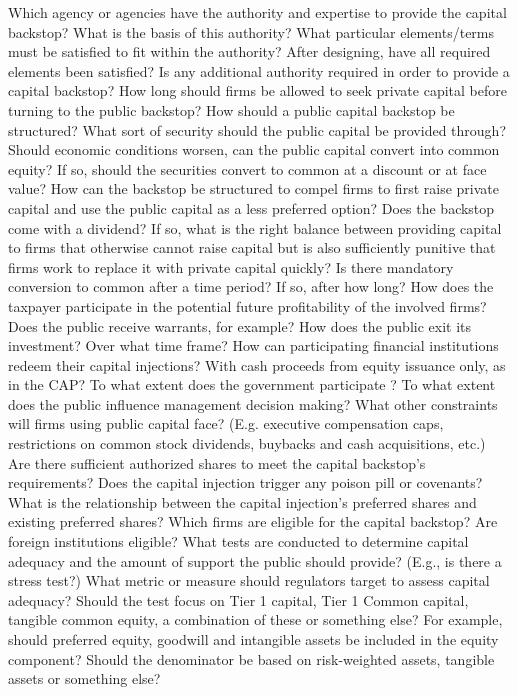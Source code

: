 \documentclass[12pt]{article}
\begin{document}
\begin{outline}[enumerate]

\1 Which agency or agencies have the authority and expertise to provide the capital backstop?
\2 What is the basis of this authority?
\2 What particular elements/terms must be satisfied to fit within the authority?
\2 After designing, have all required elements been satisfied?
\2 Is any additional authority required in order to provide a capital backstop?
\2 How long should firms be allowed to seek private capital before turning to the public backstop?
\1 How should a public capital backstop be structured?
\2 What sort of security should the public capital be provided through?
\2 Should economic conditions worsen, can the public capital convert into common equity?
\3 If so, should the securities convert to common at a discount or at face value?
\2 How can the backstop be structured to compel firms to first raise private capital and use the public capital as a less preferred option?
\2 Does the backstop come with a dividend? If so, what is the right balance between providing capital to firms that otherwise cannot raise capital but is also sufficiently punitive that firms work to replace it with private capital quickly?
\2 Is there mandatory conversion to common after a time period? If so, after how long?
\2 How does the taxpayer participate in the potential future profitability of the involved firms? Does the public receive warrants, for example?
\2 How does the public exit its investment? Over what time frame? 
\2 How can participating financial institutions redeem their capital injections? With cash proceeds from equity issuance only, as in the CAP? 
\1 To what extent does the government participate ?
\2 To what extent does the public influence management decision making?
\2 What other constraints will firms using public capital face? (E.g. executive compensation caps, restrictions on common stock dividends, buybacks and cash acquisitions, etc.)
\2 Are there sufficient authorized shares to meet the capital backstop's requirements?
\2 Does the capital injection trigger any poison pill or covenants?
\2 What is the relationship between the capital injection's preferred shares and existing preferred shares? 
\1 Which firms are eligible for the capital backstop? 
\2 Are foreign institutions eligible?
\2 What tests are conducted to determine capital adequacy and the amount of support the public should provide? (E.g., is there a stress test?)
\2 What metric or measure should regulators target to assess capital adequacy?
\3 Should the test focus on Tier 1 capital, Tier 1 Common capital, tangible common equity, a combination of these or something else?
\4 For example, should preferred equity, goodwill and intangible assets be included in the equity component?
\4 Should the denominator be based on risk-weighted assets, tangible assets or something else?

\end{outline}
\end{document}
